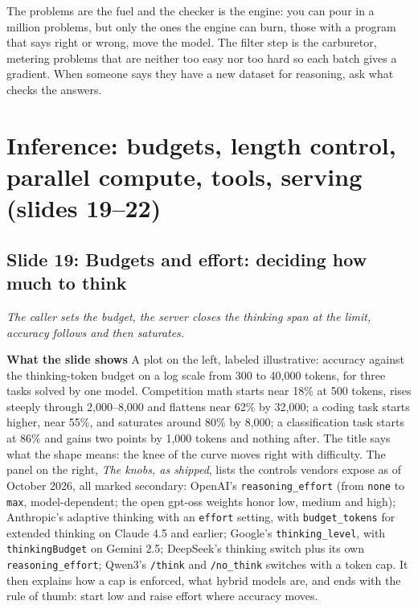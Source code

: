 \documentclass[11pt,letterpaper]{article}
\newcommand{\setstage}[1]{\colorlet{stagec}{#1}}
\newcommand{\slide}[3]{%
  \subsection[Slide #1: #2]{Slide #1: #2}%
  {\color{muted}\itshape #3\par}\medskip}
\newcommand{\para}[1]{\medskip\noindent\textbf{#1}\quad}
\newenvironment{intuition}{\begin{tcolorbox}[intuitionbox]}{\end{tcolorbox}}
\begin{document}
\begin{intuition}
The problems are the fuel and the checker is the engine: you can pour in a million problems, but only the ones the engine can burn, those with a program that says right or wrong, move the model. The filter step is the carburetor, metering problems that are neither too easy nor too hard so each batch gives a gradient. When someone says they have a new dataset for reasoning, ask what checks the answers.
\end{intuition}
\setstage{trn}
\section{Inference: budgets, length control, parallel compute, tools, serving (slides 19--22)}

\slide{19}{Budgets and effort: deciding how much to think}{The caller sets the budget, the server closes the thinking span at the limit, accuracy follows and then saturates.}

\para{What the slide shows} A plot on the left, labeled illustrative: accuracy against the thinking-token budget on a log scale from 300 to 40,000 tokens, for three tasks solved by one model. Competition math starts near 18\% at 500 tokens, rises steeply through 2,000--8,000 and flattens near 62\% by 32,000; a coding task starts higher, near 55\%, and saturates around 80\% by 8,000; a classification task starts at 86\% and gains two points by 1,000 tokens and nothing after. The title says what the shape means: the knee of the curve moves right with difficulty. The panel on the right, \emph{The knobs, as shipped}, lists the controls vendors expose as of October 2026, all marked secondary: OpenAI's \texttt{reasoning\_effort} (from \texttt{none} to \texttt{max}, model-dependent; the open gpt-oss weights honor low, medium and high); Anthropic's adaptive thinking with an \texttt{effort} setting, with \texttt{budget\_tokens} for extended thinking on Claude 4.5 and earlier; Google's \texttt{thinking\_level}, with \texttt{thinkingBudget} on Gemini 2.5; DeepSeek's thinking switch plus its own \texttt{reasoning\_effort}; Qwen3's \texttt{/think} and \texttt{/no\_think} switches with a token cap. It then explains how a cap is enforced, what hybrid models are, and ends with the rule of thumb: start low and raise effort where accuracy moves.
\end{document}
